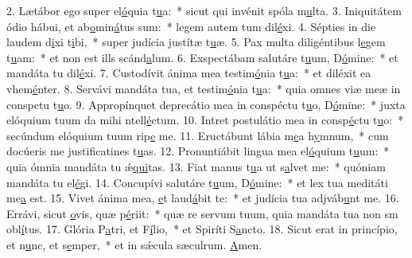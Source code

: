 2. Lætábor ego super el\uline{ó}quia t\uline{u}a:~* sicut qui invénit spóla m\uline{u}lta.
3. Iniquitátem ódio hábui, et ab\uline{o}min\uline{á}tus sum:~* legem autem tum dil\uline{é}xi.
4. Sépties in die laudem d\uline{i}xi t\uline{i}bi,~* super judícia justítæ t\uline{u}æ.
5. Pax multa diligéntibus l\uline{e}gem t\uline{u}am:~* et non est ills scánd\uline{a}lum.
6. Exspectábam salutáre t\uline{u}um, D\uline{ó}mine:~* et mandáta tu dil\uline{é}xi.
7. Custodívit ánima mea testim\uline{ó}nia t\uline{u}a:~* et diléxit ea vhem\uline{é}nter.
8. Servávi mandáta tua, et testim\uline{ó}nia t\uline{u}a:~* quia omnes viæ meæ in conspctu t\uline{u}o.
9. Appropínquet deprecátio mea in conspéctu t\uline{u}o, D\uline{ó}mine:~* juxta elóquium tuum da mihi ntell\uline{é}ctum.
10. Intret postulátio mea in consp\uline{é}ctu t\uline{u}o:~* secúndum elóquium tuum rip\uline{e} me.
11. Eructábunt lábia m\uline{e}a h\uline{y}mnum,~* cum docúeris me justificatines t\uline{u}as.
12. Pronuntiábit lingua mea el\uline{ó}quium t\uline{u}um:~* quia ómnia mandáta tu ǽ\uline{qui}tas.
13. Fiat manus t\uline{u}a ut s\uline{a}lvet me:~* quóniam mandáta tu el\uline{é}gi.
14. Concupívi salutáre t\uline{u}um, D\uline{ó}mine:~* et lex tua meditáti me\uline{a} est.
15. Vivet ánima mea, \uline{e}t laud\uline{á}bit te:~* et judícia tua adjváb\uline{u}nt me.
16. Errávi, sicut \uline{o}vis, quæ p\uline{é}riit:~* quæ re servum tuum, quia mandáta tua non sm obl\uline{í}tus.
17. Glória P\uline{a}tri, et F\uline{í}lio,~* et Spiríti S\uline{a}ncto.
18. Sicut erat in princípio, et n\uline{u}nc, et s\uline{e}mper,~* et in sǽcula sæculrum. \uline{A}men.
